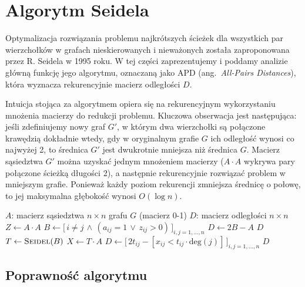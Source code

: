 \chapter{Algorytm Seidela}

Optymalizacja rozwiązania problemu najkrótszych ścieżek dla wszystkich par wierzchołków w grafach nieskierowanych i nieważonych została zaproponowana przez R. Seidela \cite{Seidel1995} w 1995 roku. W tej części zaprezentujemy i poddamy analizie główną funkcję jego algorytmu, oznaczaną jako APD (ang.\ \emph{All-Pairs Distances}), która wyznacza rekurencyjnie macierz odległości $D$.

Intuicja stojąca za algorytmem opiera się na rekurencyjnym wykorzystaniu mnożenia macierzy do redukcji problemu. Kluczowa obserwacja jest następująca: jeśli zdefiniujemy nowy graf $G'$, w którym dwa wierzchołki są połączone krawędzią dokładnie wtedy, gdy w oryginalnym grafie $G$ ich odległość wynosi co najwyżej 2, to średnica $G'$ jest dwukrotnie mniejsza niż średnica $G$. Macierz sąsiedztwa $G'$ można uzyskać jednym mnożeniem macierzy ($A \cdot A$ wykrywa pary połączone ścieżką długości 2), a następnie rekurencyjnie rozwiązać problem w mniejszym grafie. Ponieważ każdy poziom rekurencji zmniejsza średnicę o połowę, to jej maksymalna głębokość wynosi $O(\log n)$.

\begin{algorithm}
\caption{APD -- All-Pairs Distances w grafie nieważonym nieskierowanym}
\begin{algorithmic}[1]
\Require $A$: macierz sąsiedztwa $n \times n$ grafu $G$ (macierz 0-1)
\Ensure $D$: macierz odległości $n \times n$
\State $Z \leftarrow A \cdot A$
\State $B \leftarrow \bigl[\, i \neq j \,\wedge\, (a_{ij} = 1 \,\vee\, z_{ij} > 0) \,\bigr]_{i,j=1,\ldots,n}$
  \State $D \leftarrow 2B - A$
  \State \Return $D$
\EndIf
\State $T \leftarrow \textsc{Seidel}(B)$
\State $X \leftarrow T \cdot A$
\State $D \leftarrow \bigl[\, 2t_{ij} - [x_{ij} < t_{ij} \cdot \mathrm{deg}(j)] \,\bigr]_{i,j=1,\ldots,n}$
\State \Return $D$
\end{algorithmic}
\end{algorithm}

\section{Poprawność algorytmu}

